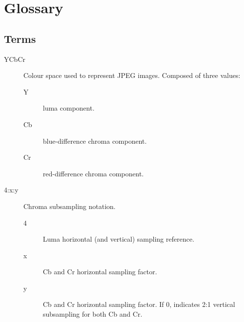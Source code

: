 \documentclass[oneside]{ecsgdp}         %
\begin{document}


\appendix
\backmatter
\chapter{Glossary}

\section*{Terms} 
\begin{description}
	\item[YCbCr] Colour space used to represent JPEG images. Composed of three values:
		\begin{description}
			\item[Y] luma component.
			\item[Cb] blue-difference chroma component.
			\item[Cr] red-difference chroma component.
		\end{description}
	\item[4:x:y]Chroma subsampling notation.
		\begin{description}
			\item[4] Luma horizontal (and vertical) sampling reference.
			\item[x] Cb and Cr horizontal sampling factor.
			\item[y] Cb and Cr horizontal sampling factor. If 0, indicates 2:1 vertical subsampling for both Cb and Cr.
		\end{description}
\end{description}
\end{document}
